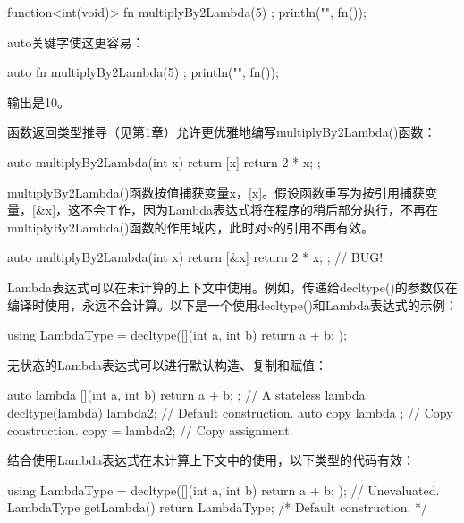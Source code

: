 \begin{cpp}
function<int(void)> fn { multiplyBy2Lambda(5) };
println("{}", fn());
\end{cpp}

auto关键字使这更容易：

\begin{cpp}
auto fn { multiplyBy2Lambda(5) };
println("{}", fn());
\end{cpp}

输出是10。

函数返回类型推导（见第1章）允许更优雅地编写multiplyBy2Lambda()函数：

\begin{cpp}
auto multiplyBy2Lambda(int x)
{
    return [x]{ return 2 * x; };
}
\end{cpp}

multiplyBy2Lambda()函数按值捕获变量x，[x]。假设函数重写为按引用捕获变量，[\&x]，这不会工作，因为Lambda表达式将在程序的稍后部分执行，不再在multiplyBy2Lambda()函数的作用域内，此时对x的引用不再有效。

\begin{cpp}
auto multiplyBy2Lambda(int x)
{
    return [&x]{ return 2 * x; }; // BUG!
}
\end{cpp}


Lambda表达式可以在未计算的上下文中使用。例如，传递给decltype()的参数仅在编译时使用，永远不会计算。以下是一个使用decltype()和Lambda表达式的示例：

\begin{cpp}
using LambdaType = decltype([](int a, int b) { return a + b; });
\end{cpp}


无状态的Lambda表达式可以进行默认构造、复制和赋值：

\begin{cpp}
auto lambda { [](int a, int b) { return a + b; } }; // A stateless lambda
decltype(lambda) lambda2; // Default construction.
auto copy { lambda }; // Copy construction.
copy = lambda2; // Copy assignment.
\end{cpp}

结合使用Lambda表达式在未计算上下文中的使用，以下类型的代码有效：

\begin{cpp}
using LambdaType = decltype([](int a, int b) { return a + b; }); // Unevaluated.
LambdaType getLambda() { return LambdaType{}; /* Default construction. */ }
\end{cpp}

